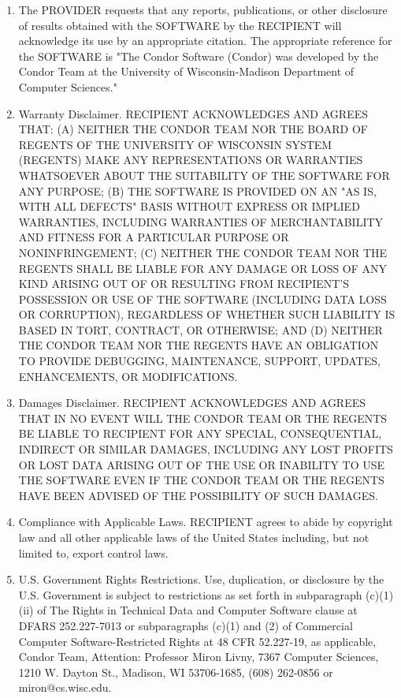 \begin{enumerate}
\item The PROVIDER requests that any reports, publications, or other
disclosure of results obtained with the SOFTWARE by the RECIPIENT will
acknowledge its use by an appropriate citation.  The appropriate reference
for the SOFTWARE is "The Condor Software (Condor) was developed by the
Condor Team at the University of Wisconsin-Madison Department of Computer
Sciences."

\item Warranty Disclaimer.  RECIPIENT ACKNOWLEDGES AND AGREES THAT:
(A) NEITHER THE CONDOR TEAM NOR THE BOARD OF REGENTS OF THE UNIVERSITY
OF WISCONSIN SYSTEM (REGENTS) MAKE ANY REPRESENTATIONS OR WARRANTIES
WHATSOEVER ABOUT THE SUITABILITY OF THE SOFTWARE FOR ANY PURPOSE; (B)
THE SOFTWARE IS PROVIDED ON AN "AS IS, WITH ALL DEFECTS" BASIS WITHOUT
EXPRESS OR IMPLIED WARRANTIES, INCLUDING WARRANTIES OF MERCHANTABILITY
AND FITNESS FOR A PARTICULAR PURPOSE OR NONINFRINGEMENT; (C) NEITHER
THE CONDOR TEAM NOR THE REGENTS SHALL BE LIABLE FOR ANY DAMAGE OR LOSS
OF ANY KIND ARISING OUT OF OR RESULTING FROM RECIPIENT'S POSSESSION
OR USE OF THE SOFTWARE (INCLUDING DATA LOSS OR CORRUPTION), REGARDLESS
OF WHETHER SUCH LIABILITY IS BASED IN TORT, CONTRACT, OR OTHERWISE;
AND (D) NEITHER THE CONDOR TEAM NOR THE REGENTS HAVE AN OBLIGATION TO
PROVIDE DEBUGGING, MAINTENANCE, SUPPORT, UPDATES, ENHANCEMENTS, OR
MODIFICATIONS.

\item Damages Disclaimer.  RECIPIENT ACKNOWLEDGES AND AGREES THAT IN
NO EVENT WILL THE CONDOR TEAM OR THE REGENTS BE LIABLE TO RECIPIENT
FOR ANY SPECIAL, CONSEQUENTIAL, INDIRECT OR SIMILAR DAMAGES, INCLUDING
ANY LOST PROFITS OR LOST DATA ARISING OUT OF THE USE OR INABILITY TO
USE THE SOFTWARE EVEN IF THE CONDOR TEAM OR THE REGENTS HAVE BEEN
ADVISED OF THE POSSIBILITY OF SUCH DAMAGES.

\item Compliance with Applicable Laws.  RECIPIENT agrees to abide by
copyright law and all other applicable laws of the United States
including, but not limited to, export control laws.

\item U.S. Government Rights Restrictions.  Use, duplication, or
disclosure by the U.S. Government is subject to restrictions as set
forth in subparagraph (c)(1)(ii) of The Rights in Technical Data and
Computer Software clause at DFARS 252.227-7013 or subparagraphs (c)(1)
and (2) of Commercial Computer Software-Restricted Rights at 48 CFR
52.227-19, as applicable, Condor Team, Attention: Professor Miron
Livny, 7367 Computer Sciences, 1210 W. Dayton St., Madison, WI
53706-1685, (608) 262-0856 or miron@cs.wisc.edu.


\end{enumerate}
